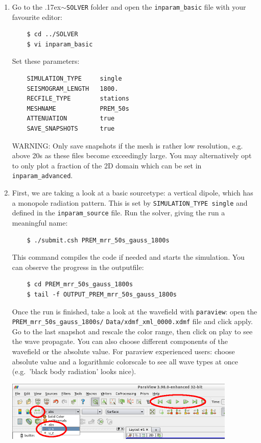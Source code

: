 \documentclass{article}
\newcommand{\ttilde}[0]{\raise.17ex\hbox{$\scriptstyle\sim$}}
\begin{document}
\begin{enumerate}
    \item Go to the \ttilde\verb|SOLVER| folder and open the
    \verb|inparam_basic| file with your favourite editor:
    \begin{verbatim}
    $ cd ../SOLVER
    $ vi inparam_basic
    \end{verbatim}
    Set these parameters:
    \begin{verbatim}
    SIMULATION_TYPE     single
    SEISMOGRAM_LENGTH   1800.
    RECFILE_TYPE        stations 
    MESHNAME            PREM_50s
    ATTENUATION         true 
    SAVE_SNAPSHOTS      true  
    \end{verbatim}
    WARNING: Only save snapshots if the mesh is rather low resolution,
    e.g. above 20s as these files become exceedingly large. You may
    alternatively opt to only plot a fraction of the 2D domain which
    can be set in \verb|inparam_advanced|.

    \item First, we are taking a look at a basic sourcetype: a vertical dipole, which has
    a monopole radiation pattern. This is set by \verb|SIMULATION_TYPE single| and defined
    in the \verb|inparam_source| file. Run the solver, giving the run a meaningful name:
    \begin{verbatim}
    $ ./submit.csh PREM_mrr_50s_gauss_1800s
    \end{verbatim}
    This command compiles the code if needed and starts the simulation. You can observe
    the progress in the outputfile:
    \begin{verbatim}
    $ cd PREM_mrr_50s_gauss_1800s
    $ tail -f OUTPUT_PREM_mrr_50s_gauss_1800s
    \end{verbatim}
    Once the run is finished, take a look at the wavefield with \verb|paraview|: open
    the \verb|PREM_mrr_50s_gauss_1800s/| \verb|Data/xdmf_xml_0000.xdmf|
    file and click apply. Go to the last snapshot and rescale the color range,
    then click on play to see the wave propagate.  You can also choose
    different components of the wavefield or the absolute value.  For paraview
    experienced users: choose absolute value and a logarithmic colorscale to
    see all wave types at once (e.g.\ 'black body radiation' looks nice). 
   
    \begin{center}
    \includegraphics[width=110mm]{paraview2.png} \hspace{5mm}
    \end{center}


\end{enumerate}
\end{document}
